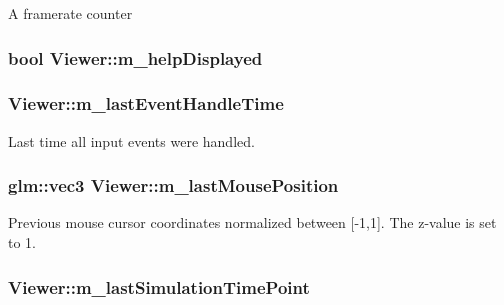 A framerate counter \hypertarget{classViewer_acbbda7f59919b475ae7e20b78118aebb}{
\subsubsection[{m\+\_\+help\+Displayed}]{\setlength{\rightskip}{0pt plus 5cm}bool Viewer\+::m\+\_\+help\+Displayed\hspace{0.3cm}{\ttfamily [private]}}}\label{classViewer_acbbda7f59919b475ae7e20b78118aebb}
\hypertarget{classViewer_a2f18581a08d0449876631f30c2e9606a}{
\subsubsection[{m\+\_\+last\+Event\+Handle\+Time}]{ Viewer\+::m\+\_\+last\+Event\+Handle\+Time\hspace{0.3cm}{\ttfamily [private]}}}\label{classViewer_a2f18581a08d0449876631f30c2e9606a}
Last time all input events were handled. \hypertarget{classViewer_a345d4a077878ba4b991a90e4147c08c5}{
\subsubsection[{m\+\_\+last\+Mouse\+Position}]{\setlength{\rightskip}{0pt plus 5cm}glm\+::vec3 Viewer\+::m\+\_\+last\+Mouse\+Position\hspace{0.3cm}{\ttfamily [private]}}}\label{classViewer_a345d4a077878ba4b991a90e4147c08c5}
Previous mouse cursor coordinates normalized between \mbox{[}-\/1,1\mbox{]}. The z-\/value is set to 1. \hypertarget{classViewer_ac20ec408b4ae6ab2b1e0a42d04be4acf}{
\subsubsection[{m\+\_\+last\+Simulation\+Time\+Point}]{ Viewer\+::m\+\_\+last\+Simulation\+Time\+Point\hspace{0.3cm}{\ttfamily [private]}}}\label{classViewer_ac20ec408b4ae6ab2b1e0a42d04be4acf}
